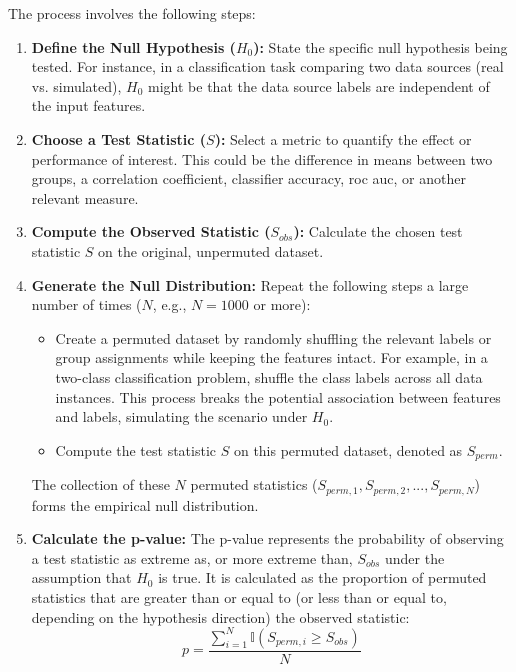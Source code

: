 The process involves the following steps:

\begin{enumerate}
    \item \textbf{Define the Null Hypothesis ($H_0$):} State the specific null hypothesis being tested. For instance, in a classification task comparing two data sources (real vs. simulated), $H_0$ might be that the data source labels are independent of the input features.
    \item \textbf{Choose a Test Statistic ($S$):} Select a metric to quantify the effect or performance of interest. This could be the difference in means between two groups, a correlation coefficient, classifier accuracy, \gls{roc} \gls{auc}, or another relevant measure.
    \item \textbf{Compute the Observed Statistic ($S_{obs}$):} Calculate the chosen test statistic $S$ on the original, unpermuted dataset.
    \item \textbf{Generate the Null Distribution:} Repeat the following steps a large number of times ($N$, e.g., $N=1000$ or more):
          \begin{itemize}
              \item Create a permuted dataset by randomly shuffling the relevant labels or group assignments while keeping the features intact. For example, in a two-class classification problem, shuffle the class labels across all data instances. This process breaks the potential association between features and labels, simulating the scenario under $H_0$.
              \item Compute the test statistic $S$ on this permuted dataset, denoted as $S_{perm}$.
          \end{itemize}
          The collection of these $N$ permuted statistics ($S_{perm, 1}, S_{perm, 2}, ..., S_{perm, N}$) forms the empirical null distribution.
    \item \textbf{Calculate the p-value:} The p-value represents the probability of observing a test statistic as extreme as, or more extreme than, $S_{obs}$ under the assumption that $H_0$ is true. It is calculated as the proportion of permuted statistics that are greater than or equal to (or less than or equal to, depending on the hypothesis direction) the observed statistic:
          \begin{equation}
              p = \frac{\sum_{i=1}^{N} \mathbb{I}(S_{perm, i} \ge S_{obs})}{N}
              \label{eq:pvalue_perm}
          \end{equation}

\end{enumerate}
